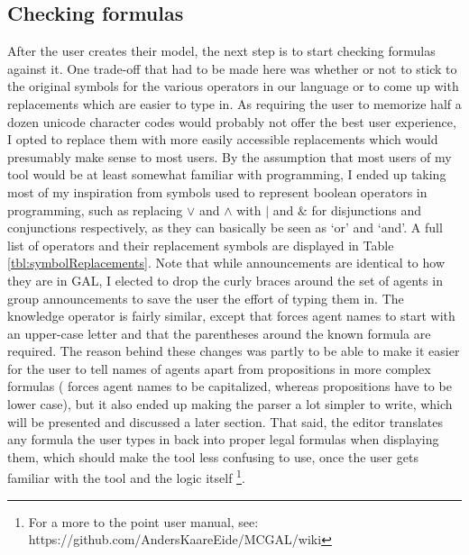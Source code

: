 \subsection{Checking formulas}

After the user creates their model, the next step is to start checking formulas against it. One trade-off that had to be made here was whether or not to stick to the original symbols for the various operators in our language or to come up with replacements which are easier to type in. As requiring the user to memorize half a dozen unicode character codes would probably not offer the best user experience, I opted to replace them with more easily accessible replacements which would presumably make sense to most users. By the assumption that most users of my tool would be at least somewhat familiar with programming, I ended up taking most of my inspiration from symbols used to represent boolean operators in programming, such as replacing $\vee$ and $\wedge$ with $|$ and $\&$ for disjunctions and conjunctions respectively, as they can basically be seen as `or' and `and'. A full list of operators and their replacement symbols are displayed in Table \ref{tbl:symbolReplacements}. Note that while announcements are identical to how they are in GAL, I elected to drop the curly braces around the set of agents in group announcements to save the user the effort of typing them in. The knowledge operator is fairly similar, except that \cname{} forces agent names to start with an upper-case letter and that the parentheses around the known formula are required. The reason behind these changes was partly to be able to make it easier for the user to tell names of agents apart from propositions in more complex formulas (\cname{} forces agent names to be capitalized, whereas propositions have to be lower case), but it also ended up making the parser a lot simpler to write, which will be presented and discussed a later section. That said, the editor translates any formula the user types in back into proper legal formulas when displaying them, which should make the tool less confusing to use, once the user gets familiar with the tool and the logic itself \footnote{For a more to the point user manual, see: https://github.com/AndersKaareEide/MCGAL/wiki}.


